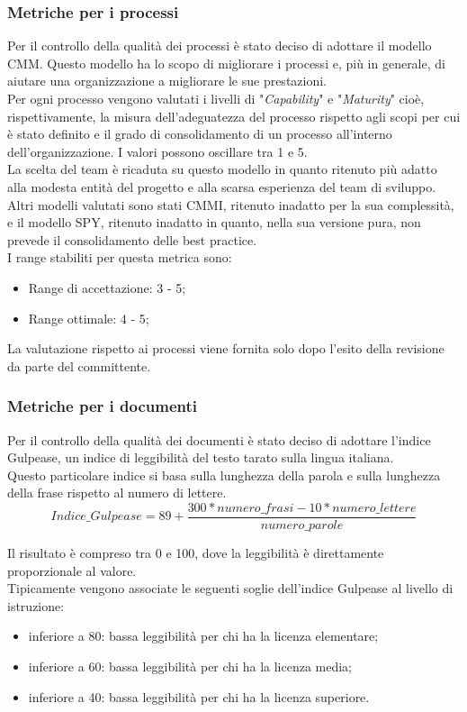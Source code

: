 	\subsubsection{Metriche per i processi}
		Per il controllo della qualità dei processi è stato deciso di adottare il modello CMM. Questo modello ha lo scopo di migliorare i processi e, più in generale, di aiutare una organizzazione a migliorare le sue prestazioni.\\
		Per ogni processo vengono valutati i livelli di "\textit{Capability}" e "\textit{Maturity}" cioè, rispettivamente, la misura dell'adeguatezza del processo  rispetto agli scopi per cui è stato definito e il grado di consolidamento di un processo all'interno dell'organizzazione. I valori possono oscillare tra 1 e 5.\\
		La scelta del team è ricaduta su questo modello in quanto ritenuto più adatto alla modesta entità del progetto e alla scarsa esperienza del team di sviluppo. Altri modelli valutati sono stati CMMI, ritenuto inadatto per la sua complessità, e il modello SPY, ritenuto inadatto in quanto, nella sua versione pura, non prevede il consolidamento delle best practice.\\
		I range stabiliti per questa metrica sono:
		\begin{itemize}
			\item Range di accettazione: 3 - 5;
			\item Range ottimale: 4 - 5;
		\end{itemize}	
		La valutazione rispetto ai processi viene fornita solo dopo l'esito della revisione da parte del committente.
	\subsubsection{Metriche per i documenti}
		Per il controllo della qualità dei documenti è stato deciso di adottare l'indice Gulpease, un indice di leggibilità del testo tarato sulla lingua italiana.\\
		Questo particolare indice si basa sulla lunghezza della parola e sulla lunghezza della frase rispetto al numero di lettere.\\
		
		\begin{equation}\label{Indice Gulpease}
		Indice\_Gulpease = 89+ \frac{300*numero\_frasi-10*numero\_lettere}{numero\_parole}
		\end{equation}
			
		Il risultato è compreso tra 0 e 100, dove la leggibilità è direttamente proporzionale al valore.\\
		Tipicamente vengono associate le seguenti soglie dell'indice Gulpease al livello di istruzione:
		\begin{itemize}
			\item inferiore a 80: bassa leggibilità per chi ha la licenza elementare;
			\item inferiore a 60: bassa leggibilità per chi ha la licenza media;
			\item inferiore a 40: bassa leggibilità per chi ha la licenza superiore.
		\end{itemize}
		
